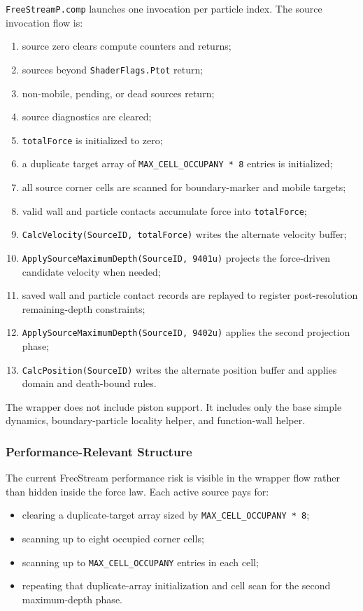 \texttt{FreeStreamP.comp} launches one invocation per particle index.  The
source invocation flow is:
\begin{enumerate}
    \item source zero clears compute counters and returns;
    \item sources beyond \texttt{ShaderFlags.Ptot} return;
    \item non-mobile, pending, or dead sources return;
    \item source diagnostics are cleared;
    \item \texttt{totalForce} is initialized to zero;
    \item a duplicate target array of
          \texttt{MAX\_CELL\_OCCUPANY * 8} entries is initialized;
    \item all source corner cells are scanned for boundary-marker and mobile
          targets;
    \item valid wall and particle contacts accumulate force into
          \texttt{totalForce};
    \item \texttt{CalcVelocity(SourceID, totalForce)} writes the alternate
          velocity buffer;
    \item \texttt{ApplySourceMaximumDepth(SourceID, 9401u)} projects the
          force-driven candidate velocity when needed;
    \item saved wall and particle contact records are replayed to register
          post-resolution remaining-depth constraints;
    \item \texttt{ApplySourceMaximumDepth(SourceID, 9402u)} applies the second
          projection phase;
    \item \texttt{CalcPosition(SourceID)} writes the alternate position buffer
          and applies domain and death-bound rules.
\end{enumerate}

The wrapper does not include piston support.  It includes only the base simple
dynamics, boundary-particle locality helper, and function-wall helper.

\subsubsection{Performance-Relevant Structure}

The current FreeStream performance risk is visible in the wrapper flow rather
than hidden inside the force law.  Each active source pays for:
\begin{itemize}
    \item clearing a duplicate-target array sized by
          \texttt{MAX\_CELL\_OCCUPANY * 8};
    \item scanning up to eight occupied corner cells;
    \item scanning up to \texttt{MAX\_CELL\_OCCUPANY} entries in each cell;
    \item repeating that duplicate-array initialization and cell scan for the
          second maximum-depth phase.
\end{itemize}

